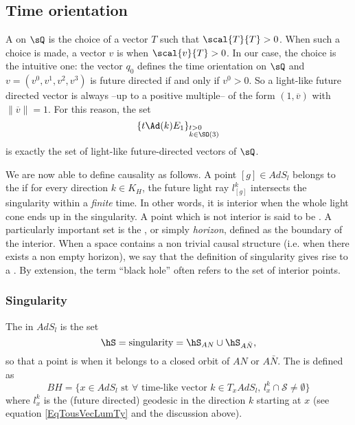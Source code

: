 \subsection{Time orientation}

A  on $\sQ$ is the choice of a vector $T$ such that $\scal{T}{T}>0$. When such a choice is made, a vector $v$ is  when $\scal{v}{T}>0$. In our case, the choice is the intuitive one: the vector $q_0$ defines the time orientation on $\sQ$ and $v=(v^0,v^1,v^2,v^3)$ is future directed if and only if $v^0>0$. So a light-like future directed vector is always --up to a positive multiple-- of the form $(1,\overline{v})$ with $\|\overline{v}\|=1$. For this reason, the set
\begin{equation}	\label{EqTousVecLumTy}
  \{t\Ad(k)E_1\}_{%
\begin{subarray}{l}
t>0\\k\in \SO(3)
\end{subarray}
}
\end{equation}
is exactly the set of light-like future-directed vectors of $\sQ$.

We are now able to define causality as follows.  A point $[g]\in AdS_l$ belongs to the  if for every direction $k\in K_H$, the future light ray $l^k_{[g]}$ intersects the singularity within a \emph{finite} time.  In other words, it is interior when the whole light cone ends up in the singularity.  A point which is not interior is said to be . A particularly important set is the , or simply \emph{horizon}, defined as the boundary of the interior. When a space contains a non trivial causal structure (i.e. when there exists a non empty horizon), we say that the definition of singularity gives rise to a .  By extension, the term ``black hole'' often refers to the set of interior points.

\subsubsection{Singularity}

\begin{definition}		\label{Singular}
    The  in $AdS_l$ is the set
    \[
      \hS=\text{singularity}=\hS_{AN}\cup\hS_{A\bar N},
    \]
    so that a point is  when it belongs to a closed orbit of $AN$ or $A\bar N$. The  is defined as
    \[
      BH=\{ x\in AdS_{l} \text{ st } \forall \text{ time-like vector } k\in T_xAdS_l,\,  l^k_x\cap\mathcal{S}\neq\emptyset \}
    \]
    where $l^k_x$ is the (future directed) geodesic in the direction $k$ starting at $x$ (see equation \eqref{EqTousVecLumTy} and the discussion above).
\end{definition}

